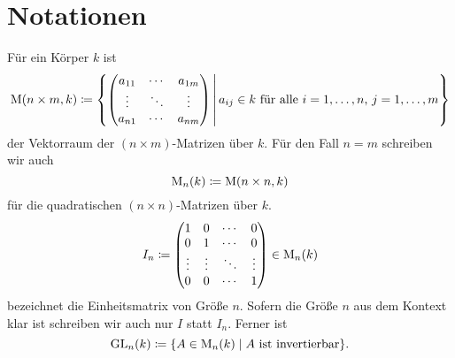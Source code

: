 \section{Notationen}

Für ein Körper $k$ ist
\[
 \operatorname{M}(n \times m, k) \coloneqq
 \left\{
  \begin{pmatrix}
   a_{11} & \cdots & a_{1m} \\
   \vdots & \ddots & \vdots \\
   a_{n1} & \cdots & a_{nm}
  \end{pmatrix}
  \,\middle|\,
  \text{$a_{ij} \in k$ für alle $i=1,\dotsc,n$, $j=1,\dotsc,m$}
  \right\}
\]
der Vektorraum der $(n \times m)$-Matrizen über $k$. Für den Fall $n = m$ schreiben wir auch
\[
 \operatorname{M}_n(k) \coloneqq \operatorname{M}(n \times n, k)
\]
für die quadratischen $(n \times n)$-Matrizen über $k$.
\[
 I_n \coloneqq
 \begin{pmatrix}
  1      & 0      & \cdots & 0      \\
  0      & 1      & \cdots & 0      \\
  \vdots & \vdots & \ddots & \vdots \\
  0      & 0      & \cdots & 1
 \end{pmatrix}
 \in \operatorname{M}_n(k)
\]
bezeichnet die Einheitsmatrix von Größe $n$. Sofern die Größe $n$ aus dem Kontext klar ist schreiben wir auch nur $I$ statt $I_n$. Ferner ist
\[
 \operatorname{GL}_n(k) \coloneqq \{A \in \operatorname{M}_n(k) \mid \text{$A$ ist invertierbar}\}.
\]